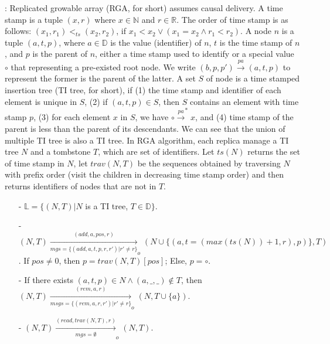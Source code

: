 {\color {red}
: Replicated growable array (RGA, for short) assumes causal delivery. A time stamp is a tuple $(x,r)$ where $x \in \mathbb{N}$ and $r \in \mathbb{R}$. The order of time stamp is as follows: $(x_1,r_1) <_{\mathit{ts}} (x_2,r_2)$, if $x_1 < x_2 \vee (x_1 = x_2 \wedge r_1 < r_2)$. A node $n$ is a tuple $(a,t,p)$, where $a \in \mathbb{D}$ is the value (identifier) of $n$, $t$ is the time stamp of $n$, and $p$ is the parent of $n$, either a time stamp used to identify or a special value $\circ$ that representing a pre-existed root node. We write $(b,p,p') \xrightarrow{\mathit{pa}} (a,t,p)$ to represent the former is the parent of the latter. A set $S$ of node is a time stamped insertion tree (TI tree, for short), if (1) the time stamp and identifier of each element is unique in $S$, (2) if $(a,t,p) \in S$, then $S$ contains an element with time stamp $p$, (3) for each element $x$ in $S$, we have $\circ \xrightarrow{\mathit{pa}}^* x$, and (4) time stamp of the parent is less than the parent of its descendants. We can see that the union of multiple TI tree is also a TI tree. In RGA algorithm, each replica manage a TI tree $N$ and a tombstone $T$, which are set of identifiers. Let $\mathit{ts}(N)$ returns the set of time stamp in $N$, let $\mathit{trav}(N,T)$ be the sequences obtained by traversing $N$ with prefix order (visit the children in decreasing time stamp order) and then returns identifiers of nodes that are not in $T$.

\begin{itemize}
\setlength{\itemsep}{0.5pt}
\item[-] $\mathbb{L} = \{ (N,T) \vert N$ is a TI tree, $T \in \mathbb{D} \}$.

\item[-] $(N,T) \xrightarrow[\mathit{mgs} = \{ (\mathit{add},a,t,p,r,r') \vert r' \neq r \}]{(\mathit{add},a,\mathit{pos},r)}_o (N \cup \{ (a,t=(\mathit{max}(\mathit{ts}(N))+1,r),p) \}, T)$. If $\mathit{pos} \neq 0$, then $p = \mathit{trav}(N,T)[\mathit{pos}]$; Else, $p = \circ$.

\item[-] If there exists $(a,t,p) \in N \wedge (a,\_,\_) \notin T$, then $(N,T) \xrightarrow[\mathit{msgs} = \{ (\mathit{rem},a,r,r') \vert r' \neq r \} ]{(\mathit{rem},a,r)}_o (N,T \cup \{ a \})$.

\item[-] $(N,T) \xrightarrow[\mathit{mgs} = \emptyset]{(\mathit{read},\mathit{trav}(N,T),r)}_o (N,T)$.


\end{itemize}}
